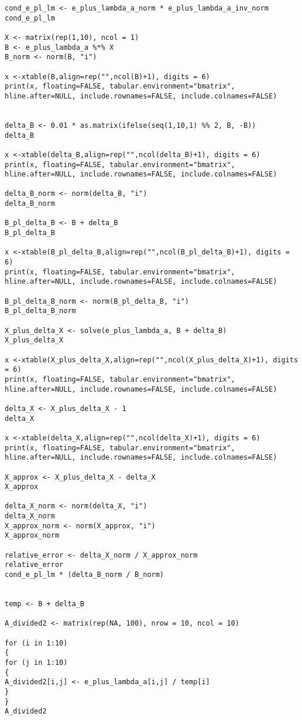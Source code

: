 \documentclass[14pt,a4paper]{scrartcl}
\begin{document}
\begin{lstlisting}
cond_e_pl_lm <- e_plus_lambda_a_norm * e_plus_lambda_a_inv_norm
cond_e_pl_lm

X <- matrix(rep(1,10), ncol = 1)
B <- e_plus_lambda_a %*% X
B_norm <- norm(B, "i")

x <-xtable(B,align=rep("",ncol(B)+1), digits = 6)
print(x, floating=FALSE, tabular.environment="bmatrix", 
hline.after=NULL, include.rownames=FALSE, include.colnames=FALSE)


delta_B <- 0.01 * as.matrix(ifelse(seq(1,10,1) %% 2, B, -B))
delta_B

x <-xtable(delta_B,align=rep("",ncol(delta_B)+1), digits = 6)
print(x, floating=FALSE, tabular.environment="bmatrix", 
hline.after=NULL, include.rownames=FALSE, include.colnames=FALSE)

delta_B_norm <- norm(delta_B, "i")
delta_B_norm

B_pl_delta_B <- B + delta_B
B_pl_delta_B

x <-xtable(B_pl_delta_B,align=rep("",ncol(B_pl_delta_B)+1), digits = 6)
print(x, floating=FALSE, tabular.environment="bmatrix", 
hline.after=NULL, include.rownames=FALSE, include.colnames=FALSE)

B_pl_delta_B_norm <- norm(B_pl_delta_B, "i")
B_pl_delta_B_norm

X_plus_delta_X <- solve(e_plus_lambda_a, B + delta_B)
X_plus_delta_X

x <-xtable(X_plus_delta_X,align=rep("",ncol(X_plus_delta_X)+1), digits = 6)
print(x, floating=FALSE, tabular.environment="bmatrix", 
hline.after=NULL, include.rownames=FALSE, include.colnames=FALSE)

delta_X <- X_plus_delta_X - 1
delta_X

x <-xtable(delta_X,align=rep("",ncol(delta_X)+1), digits = 6)
print(x, floating=FALSE, tabular.environment="bmatrix", 
hline.after=NULL, include.rownames=FALSE, include.colnames=FALSE)

X_approx <- X_plus_delta_X - delta_X
X_approx

delta_X_norm <- norm(delta_X, "i")
delta_X_norm
X_approx_norm <- norm(X_approx, "i")
X_approx_norm

relative_error <- delta_X_norm / X_approx_norm
relative_error
cond_e_pl_lm * (delta_B_norm / B_norm)


temp <- B + delta_B

A_divided2 <- matrix(rep(NA, 100), nrow = 10, ncol = 10)

for (i in 1:10)
{
for (j in 1:10)
{
A_divided2[i,j] <- e_plus_lambda_a[i,j] / temp[i]
}
}
A_divided2


\end{lstlisting}
\end{document}
